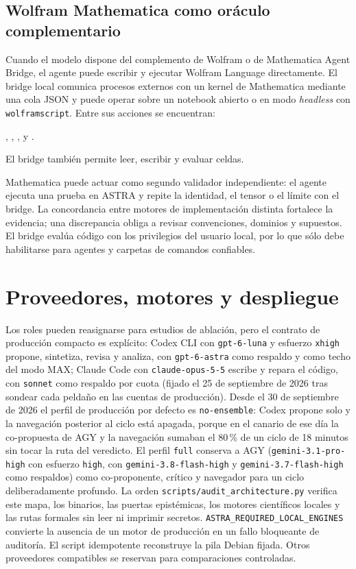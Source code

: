 \documentclass[11pt,a4paper]{article}
\begin{document}
\subsection{Wolfram Mathematica como oráculo complementario}

Cuando el modelo dispone del complemento de Wolfram o de Mathematica Agent Bridge, el agente puede escribir y ejecutar Wolfram Language directamente. El bridge local comunica procesos externos con un kernel de Mathematica mediante una cola JSON y puede operar sobre un notebook abierto o en modo \textit{headless} con \texttt{wolframscript}. Entre sus acciones se encuentran:

\begin{center}
, , ,
 y .
\end{center}

El bridge también permite leer, escribir y evaluar celdas.

Mathematica puede actuar como segundo validador independiente: el agente ejecuta una prueba en ASTRA y repite la identidad, el tensor o el límite con el bridge. La concordancia entre motores de implementación distinta fortalece la evidencia; una discrepancia obliga a revisar convenciones, dominios y supuestos. El bridge evalúa código con los privilegios del usuario local, por lo que sólo debe habilitarse para agentes y carpetas de comandos confiables.

\section{Proveedores, motores y despliegue}

Los roles pueden reasignarse para estudios de ablación, pero el contrato de producción compacto es explícito: Codex CLI con \texttt{gpt-6-luna} y esfuerzo \texttt{xhigh} propone, sintetiza, revisa y analiza, con \texttt{gpt-6-astra} como respaldo y como techo del modo MAX; Claude Code con \texttt{claude-opus-5-5} escribe y repara el código, con \texttt{sonnet} como respaldo por cuota (fijado el 25 de septiembre de 2026 tras sondear cada peldaño en las cuentas de producción). Desde el 30 de septiembre de 2026 el perfil de producción por defecto es \texttt{no-ensemble}: Codex propone solo y la navegación posterior al ciclo está apagada, porque en el canario de ese día la co-propuesta de AGY y la navegación sumaban el 80\,\% de un ciclo de 18 minutos sin tocar la ruta del veredicto. El perfil \texttt{full} conserva a AGY (\texttt{gemini-3.1-pro-high} con esfuerzo \texttt{high}, con \texttt{gemini-3.8-flash-high} y \texttt{gemini-3.7-flash-high} como respaldos) como co-proponente, crítico y navegador para un ciclo deliberadamente profundo. La orden \texttt{scripts/audit\_architecture.py} verifica este mapa, los binarios, las puertas epistémicas, los motores científicos locales y las rutas formales sin leer ni imprimir secretos. \texttt{ASTRA\_REQUIRED\_LOCAL\_ENGINES} convierte la ausencia de un motor de producción en un fallo bloqueante de auditoría. El script idempotente  reconstruye la pila Debian fijada. Otros proveedores compatibles se reservan para comparaciones controladas.
\end{document}
